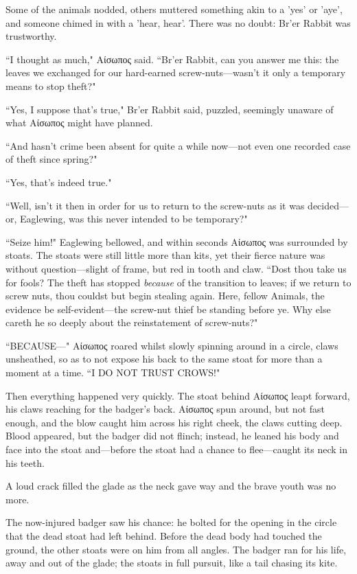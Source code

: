 Some of the animals nodded, others muttered something akin to a 'yes' or 'aye', and someone chimed in with a 'hear, hear'.
There was no doubt: Br'er Rabbit was trustworthy.

``I thought as much," Αίσωπος said.
``Br'er Rabbit, can you answer me this: the leaves we exchanged for our hard-earned screw-nuts---wasn't it only a temporary means to stop theft?"

``Yes, I suppose that's true," Br'er Rabbit said, puzzled, seemingly unaware of what Αίσωπος might have planned.

``And hasn't crime been absent for quite a while now---not even one recorded case of theft since spring?"

``Yes, that's indeed true."

``Well, isn't it then in order for us to return to the screw-nuts as it was decided---or, Eaglewing, was this never intended to be temporary?"

``Seize him!" Eaglewing bellowed, and within seconds Αίσωπος was surrounded by stoats.
The stoats were still little more than kits, yet their fierce nature was without question---slight of frame, but red in tooth and claw. %
``Dost thou take us for fools?
The theft has stopped \textit{because} of the transition to leaves; if we return to screw nuts, thou couldst but begin stealing again.
Here, fellow Animals, the evidence be self-evident---the screw-nut thief be standing before ye.
Why else careth he so deeply about the reinstatement of screw-nuts?" %

``BECAUSE---" Αίσωπος roared whilst slowly spinning around in a circle, claws unsheathed, so as to not expose his back to the same stoat for more than a moment at a time.
``I DO NOT TRUST CROWS!"

Then everything happened very quickly.
The stoat behind Αίσωπος leapt forward, his claws reaching for the badger's back.
Αίσωπος spun around, but not fast enough, and the blow caught him across his right cheek, the claws cutting deep.
Blood appeared, but the badger did not flinch; instead, he leaned his body and face into the stoat and---before the stoat had a chance to flee---caught its neck in his teeth.

A loud crack filled the glade as the neck gave way and the brave youth was no more.

The now-injured badger saw his chance: he bolted for the opening in the circle that the dead stoat had left behind.
Before the dead body had touched the ground, the other stoats were on him from all angles.
The badger ran for his life, away and out of the glade; the stoats in full pursuit, like a tail chasing its kite.


